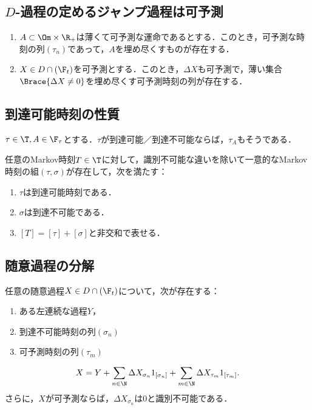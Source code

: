 \documentclass[uplatex,dvipdfmx]{jsreport}
\begin{document}
\subsection{$D$-過程の定めるジャンプ過程は可予測}

\begin{theorem}\mbox{}
    \begin{enumerate}
        \item $A\subset\Om\times\R_+$は薄くて可予測な運命であるとする．このとき，可予測な時刻の列$(\tau_n)$であって，$A$を埋め尽くすものが存在する．
        \item $X\in D\cap(\F_t)$を可予測とする．このとき，$\Delta X$も可予測で，薄い集合$\Brace{\Delta X\ne0}$を埋め尽くす可予測時刻の列が存在する．
    \end{enumerate}
\end{theorem}

\subsection{到達可能時刻の性質}

\begin{proposition}
    $\tau\in\T,A\in\F_\tau$とする．$\tau$が到達可能／到達不可能ならば，$\tau_A$もそうである．
\end{proposition}

\begin{theorem}[Markov時刻の直交分解]
    任意のMarkov時刻$T\in\T$に対して，識別不可能な違いを除いて一意的なMarkov時刻の組$(\tau,\sigma)$が存在して，次を満たす：
    \begin{enumerate}
        \item $\tau$は到達可能時刻である．
        \item $\sigma$は到達不可能である．
        \item $[T]=[\tau]+[\sigma]$と非交和で表せる．
    \end{enumerate}
\end{theorem}

\subsection{随意過程の分解}

\begin{theorem}[随意過程の軌跡]
    任意の随意過程$X\in D\cap(\F_t)$について，次が存在する：
    \begin{enumerate}
        \item ある左連続な過程$Y$，
        \item 到達不可能時刻の列$(\sigma_n)$
        \item 可予測時刻の列$(\tau_m)$
    \end{enumerate}
    \[X=Y+\sum_{n\in\N}\Delta X_{\sigma_n}1_{[\sigma_n]}+\sum_{m\in\N}\Delta X_{\tau_m}1_{[\tau_m]}.\]
    さらに，$X$が可予測ならば，$\Delta X_{\sigma_n}$は$0$と識別不可能である．
\end{theorem}
\end{document}
